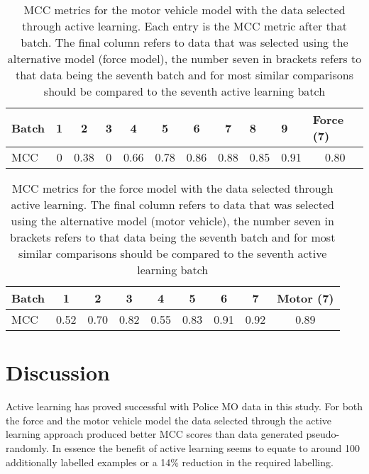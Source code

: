 \begin{table}[]
\centering
\begin{tabular}{@{}lcccccccccc@{}}
\toprule
Batch  & 1 & 2    & 3 & 4    & 5    & 6    & 7    & \multicolumn{1}{l}{8} & \multicolumn{1}{l}{9} & \multicolumn{1}{l}{Force (7)} \\ \midrule
MCC    & 0 & 0.38 & 0 & 0.66 & 0.78 & 0.86 & 0.88 & 0.85                  & 0.91                  & 0.80                             \\ \midrule
\end{tabular}
\caption[MCC metrics. PF1 data. Car stolen model]{\label{tab:active_results_car} MCC metrics for the motor vehicle model with the data selected through active learning. Each entry is the MCC metric after that batch. The final column refers to data that was selected using the alternative model (force model), the number seven in brackets refers to that data being the seventh batch and for most similar comparisons should be compared to the seventh active learning batch}
\end{table}

\begin{table}[]
\centering
\begin{tabular}{@{}llllllllc@{}}
\toprule
Batch    & \multicolumn{1}{c}{1} & \multicolumn{1}{c}{2} & \multicolumn{1}{c}{3} & \multicolumn{1}{c}{4} & \multicolumn{1}{c}{5} & \multicolumn{1}{c}{6} & \multicolumn{1}{c}{7} & \multicolumn{1}{c}{Motor (7)} \\ \midrule
MCC    & 0.52                  & 0.70                  & 0.82                  & 0.55                  & 0.83                  & 0.91                  & 0.92   & 0.89                \\ \bottomrule
\end{tabular}
\caption[MCC metrics. PF1 data. force used model]{\label{tab:active_results_force} MCC metrics for the force model with the data selected through active learning. The final column refers to data that was selected using the alternative model (motor vehicle), the number seven in brackets refers to that data being the seventh batch and for most similar comparisons should be compared to the seventh  active learning batch}
\end{table}


\section{Discussion} Active learning has proved successful with Police MO data in this study. For both the force and the motor vehicle model the data selected through the active learning approach produced better MCC scores than data generated pseudo-randomly. In essence the benefit of active learning seems to equate to around 100 additionally labelled examples or a 14\% reduction in the required labelling.

